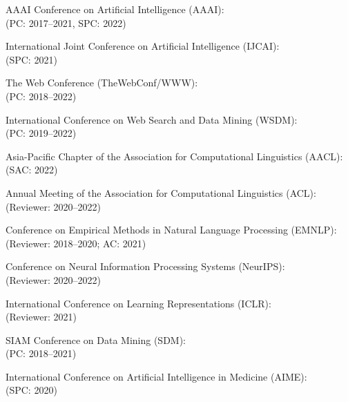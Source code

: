 \documentclass[10pt]{article}
\newenvironment{myindentpar}[1]%
{\begin{list}{}%
         {\setlength{\leftmargin}{#1}}%
         \item[]%
}
{\end{list}}
\newcounter{list}
\begin{document}
\begin{myindentpar}{0.75cm}
{\hspace{-0.75cm}AAAI Conference on Artificial Intelligence (AAAI): \\
(PC: 2017--2021, SPC: 2022)

\hspace{-0.75cm}International Joint Conference on Artificial Intelligence (IJCAI): \\
(SPC: 2021)

\hspace{-0.75cm}The Web Conference (TheWebConf/WWW): \\
(PC: 2018--2022)

\hspace{-0.75cm}International Conference on Web Search and Data Mining (WSDM): \\
(PC: 2019--2022)

\hspace{-0.75cm}Asia-Pacific Chapter of the Association for Computational Linguistics (AACL): \\
(SAC: 2022)

\hspace{-0.75cm}Annual Meeting of the Association for Computational Linguistics (ACL): \\
(Reviewer: 2020--2022)

\hspace{-0.75cm}Conference on Empirical Methods in Natural Language Processing (EMNLP): \\
(Reviewer: 2018--2020; AC: 2021)

\hspace{-0.75cm}Conference on Neural Information Processing Systems (NeurIPS): \\
(Reviewer: 2020--2022)

\hspace{-0.75cm}International Conference on Learning Representations (ICLR): \\
(Reviewer: 2021)

\hspace{-0.75cm}SIAM Conference on Data Mining (SDM): \\
(PC: 2018--2021)

\hspace{-0.75cm}International Conference on Artificial Intelligence in Medicine (AIME): \\
(SPC: 2020)

}


\hspace{-0.75cm}{\bf Journal Reviewer}


\end{myindentpar}
\end{document}
